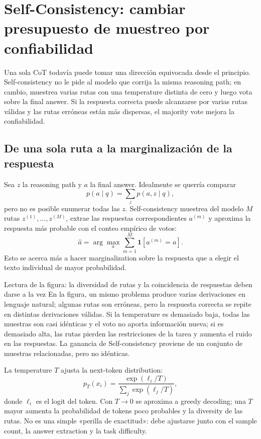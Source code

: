 \section{Self-Consistency: cambiar presupuesto de muestreo por confiabilidad}

Una sola CoT todavía puede tomar una dirección equivocada desde el principio. Self-consistency no le pide al modelo que corrija la misma reasoning path; en cambio, muestrea varias rutas con una temperature distinta de cero y luego vota sobre la final answer. Si la respuesta correcta puede alcanzarse por varias rutas válidas y las rutas erróneas están más dispersas, el majority vote mejora la confiabilidad.

\subsection{De una sola ruta a la marginalización de la respuesta}

Sea $z$ la reasoning path y $a$ la final answer. Idealmente se querría comparar
\[
p(a\mid q)=\sum_z p(a,z\mid q),
\]
pero no es posible enumerar todas las $z$. Self-consistency muestrea del modelo $M$ rutas $z^{(1)},\ldots,z^{(M)}$, extrae las respuestas correspondientes $a^{(m)}$ y aproxima la respuesta más probable con el conteo empírico de votos:
\[
\hat a=\arg\max_a \sum_{m=1}^{M}\mathbf{1}\!\left[a^{(m)}=a\right].
\]
Esto se acerca más a hacer marginalization sobre la respuesta que a elegir el texto individual de mayor probabilidad.


\begin{knowledgebox}{Lectura de la figura: la diversidad de rutas y la coincidencia de respuestas deben darse a la vez}
En la figura, un mismo problema produce varias derivaciones en lenguaje natural; algunas rutas son erróneas, pero la respuesta correcta se repite en distintas derivaciones válidas. Si la temperature es demasiado baja, todas las muestras son casi idénticas y el voto no aporta información nueva; si es demasiado alta, las rutas pierden las restricciones de la tarea y aumenta el ruido en las respuestas. La ganancia de Self-consistency proviene de un conjunto de muestras relacionadas, pero no idénticas.
\end{knowledgebox}

La temperature $T$ ajusta la next-token distribution:
\[
p_T(x_i)=\frac{\exp(\ell_i/T)}{\sum_j\exp(\ell_j/T)},
\]
donde $\ell_i$ es el logit del token. Con $T\to 0$ se aproxima a greedy decoding; una $T$ mayor aumenta la probabilidad de tokens poco probables y la diversity de las rutas. No es una simple «perilla de exactitud»: debe ajustarse junto con el sample count, la answer extraction y la task difficulty.

